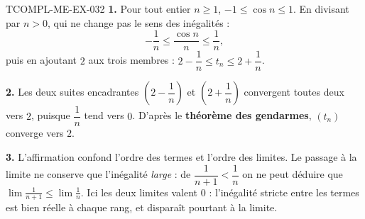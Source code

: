 \begin{corrige}{TCOMPL-ME-EX-032}
\textbf{1.} Pour tout entier $n \geq 1$, $-1 \leq \cos n \leq 1$. En divisant par $n>0$, qui ne change pas le sens des inégalités :
\[
  -\frac{1}{n} \leq \frac{\cos n}{n} \leq \frac{1}{n},
\]
puis en ajoutant $2$ aux trois membres : $2-\dfrac{1}{n} \leq t_n \leq 2+\dfrac{1}{n}$.

\textbf{2.} Les deux suites encadrantes $\left(2-\dfrac{1}{n}\right)$ et $\left(2+\dfrac{1}{n}\right)$ convergent toutes deux vers $2$, puisque $\dfrac{1}{n}$ tend vers $0$. D'après le \textbf{théorème des gendarmes}, $(t_n)$ converge vers $2$.

\textbf{3.} L'affirmation confond l'ordre des termes et l'ordre des limites. Le passage à la limite ne conserve que l'inégalité \emph{large} : de $\dfrac{1}{n+1} < \dfrac{1}{n}$ on ne peut déduire que $\displaystyle\lim \frac{1}{n+1} \leq \lim \frac{1}{n}$. Ici les deux limites valent $0$ : l'inégalité stricte entre les termes est bien réelle à chaque rang, et disparaît pourtant à la limite.
\end{corrige}
